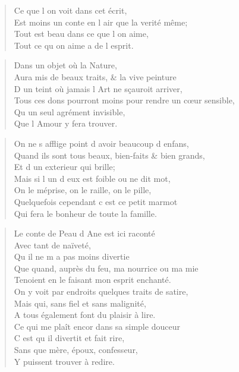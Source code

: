 \begin{verse}
Ce que l\textquotesingle{} on voit dans cet écrit, \\
Est moins un conte en l\textquotesingle{} air que la verité même; \\
Tout est beau dans ce que l\textquotesingle{} on aime, \\
Tout ce qu\textquotesingle{} on aime a de l\textquotesingle{} esprit.
\end{verse}

\begin{verse}
\vin\vin Dans un objet où la Nature, \\
\vin\vin Aura mis de beaux traits, \& la vive peinture \\
\vin D\textquotesingle{} un teint où jamais l\textquotesingle{} Art ne sçauroit arriver, \\
Tous ces dons pourront moins pour rendre un cœur sensible, \\
\vin\vin Qu\textquotesingle{} un seul agrément invisible, \\
\vin\vin Que l\textquotesingle{} Amour y fera trouver.
\end{verse}

\begin{verse}
On ne s\textquotesingle{} afflige point d\textquotesingle{} avoir beaucoup d\textquotesingle{} enfans, \\
\vin Quand ils sont tous beaux, bien-faits \& bien grands, \\
\vin Et d\textquotesingle{} un exterieur qui brille; \\
\vin Mais si l\textquotesingle{} un d\textquotesingle{} eux est foible ou ne dit mot, \\
\vin On le méprise, on le raille, on le pille, \\
Quelquefois cependant c\textquotesingle{} est ce petit marmot \\
Qui fera le bonheur de toute la famille.
\end{verse}

\begin{verse}
Le conte de Peau d\textquotesingle{} Ane est ici raconté \\
\vin Avec tant de naïveté, \\
\vin Qu\textquotesingle{} il ne m\textquotesingle{} a pas moins divertie \\
Que quand, auprès du feu, ma nourrice ou ma mie \\
Tenoient en le faisant mon esprit enchanté. \\
On y voit par endroits quelques traits de satire, \\
\vin Mais qui, sans fiel et sans malignité, \\
A tous également font du plaisir à lire. \\
Ce qui me plaît encor dans sa simple douceur \\
\vin C\textquotesingle{} est qu\textquotesingle{} il divertit et fait rire, \\
\vin Sans que mère, époux, confesseur, \\
\vin Y puissent trouver à redire.
\end{verse}


